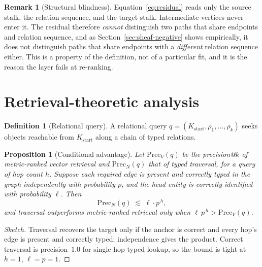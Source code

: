 \documentclass[11pt]{article}
\newtheorem{proposition}[theorem]{Proposition}
\theoremstyle{definition}
\newtheorem{definition}[theorem]{Definition}
\newtheorem{remark}[theorem]{Remark}
\begin{document}
\begin{remark}[Structural blindness]
\label{rem:blind}
Equation~\eqref{eq:residual} reads only the source stalk, the relation sequence, and
the target stalk. Intermediate vertices never enter it. The residual therefore
\emph{cannot} distinguish two paths that share endpoints and relation sequence, and as
Section~\ref{sec:sheaf-negative} shows empirically, it does not distinguish paths that
share endpoints with a \emph{different} relation sequence either. This is a property of
the definition, not of a particular fit, and it is the reason the layer fails at
re-ranking.
\end{remark}

\section{Retrieval-theoretic analysis}
\label{sec:theory}

\begin{definition}[Relational query]
A relational query $q=(K_{\mathrm{start}},\rho_1,\dots,\rho_k)$ seeks objects reachable
from $K_{\mathrm{start}}$ along a chain of typed relations.
\end{definition}

\begin{proposition}[Conditional advantage]
\label{prop:conditional}
Let $\mathrm{Prec}_V(q)$ be the precision@$k$ of metric-ranked vector retrieval and
$\mathrm{Prec}_N(q)$ that of typed traversal, for a query of hop count $h$. Suppose
each required edge is present and correctly typed in the graph independently with
probability $p$, and the head entity is correctly identified with probability $\ell$.
Then
\begin{equation}
  \mathrm{Prec}_N(q) \;\lesssim\; \ell \cdot p^{\,h},
  \label{eq:compounding}
\end{equation}
and traversal outperforms metric-ranked retrieval only when
$\ell\,p^{\,h} > \mathrm{Prec}_V(q)$.
\end{proposition}

\begin{proof}[Sketch]
Traversal recovers the target only if the anchor is correct and every hop's edge is
present and correctly typed; independence gives the product. Correct traversal is
precision~$1.0$ for single-hop typed lookup, so the bound is tight at $h=1$,
$\ell=p=1$.
\end{proof}
\end{document}
